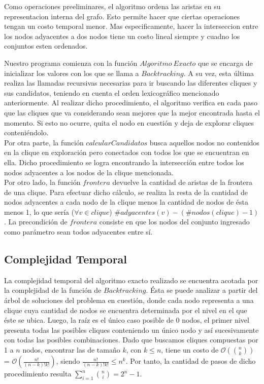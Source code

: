 Como operaciones preeliminares, el algoritmo ordena las aristas en su representacion interna del grafo. Esto permite hacer que ciertas operaciones tengan un costo temporal menor. Mas especificamente, hacer la interseccion entre los nodos adyacentes a dos nodos tiene un costo lineal siempre y cuadno los conjuntos esten ordenados.

Nuestro programa comienza con la función $Algoritmo\ Exacto$ que se encarga de inicializar los valores con los que se llama a $Backtracking$. A su vez, esta última realiza las llamadas recursivas necesarias para ir buscando las diferentes cliques y sus candidatos, teniendo en cuenta el orden lexicográfico mencionado anteriormente. Al realizar dicho procedimiento, el algoritmo verifica en cada paso que las cliques que va considerando sean mejores que la mejor encontrada hasta el momento. Si esto no ocurre, quita el nodo en cuestión y deja de explorar cliques conteniéndolo.\\
\newline
Por otra parte, la función $calcularCandidatos$ busca aquellos nodos no contenidos en la clique en exploración pero conectados con todos los que se encuentran en ella. Dicho procedimiento se logra encontrando la intersección entre todos los nodos adyacentes a los nodos de la clique mencionada.\\
\newline
Por otro lado, la función $frontera$ devuelve la cantidad de aristas de la frontera de una clique. Para efectuar dicho cálculo, se realiza la resta de la cantidad de nodos adyacentes a cada nodo de la clique menos la cantidad de nodos de ésta menos 1, lo que sería ($\forall v \in clique$) $\#adyacentes(v)-(\#nodos(clique)-1)$. La precondición de $frontera$ consiste en que los nodos del conjunto ingresado como parámetro sean todos adyacentes entre sí.

\subsection{Complejidad Temporal}

La complejidad temporal del algoritmo exacto realizado se encuentra acotada por la complejidad de la función de $Backtracking$. Ésta se puede analizar a partir del árbol de soluciones del problema en cuestión, donde cada nodo representa a una clique cuya cantidad de nodos se encuentra determinada por el nivel en el que éste se ubica. Luego, la raíz es el único caso posible de 0 nodos, el primer nivel presenta todas las posibles cliques conteniendo un único nodo y así sucesivamente con todas las posibles combinaciones. Dado que buscamos cliques compuestas por 1 a $n$ nodos, encontrar las de tamaño $k$, con $k\leq n$, tiene un costo de $\mathcal{O}({n \choose k})$ = $\mathcal{O}(\frac{n!}{(n-k)!k!})$, siendo $\frac{n!}{(n-k)!k!} \leq n^k$. Por tanto, la cantidad de pasos de dicho procedimiento resulta $\sum\limits_{i=1}^n {n \choose i} = 2^n - 1$. 

